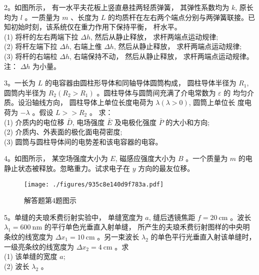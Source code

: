 2。如图所示， 有一水平夫花板上竖直悬挂两轻质弹簧， 其弹性系数均为 $k$, 原长均为 $l$ 。一质量为 $m$ 、长度为 $L$ 的均质杆在左右两个端点分别与两弹簧联接。已知初始时刻，该系统仅在重力作用下保持平衡， 杆水平。\\
(1) 将杆的左右两端下拉 $\Delta h$, 然后从静止释放， 求杆两端点运动规律;\\
(2) 将杆左端下拉 $\Delta h$, 右端上倠 $\Delta h$, 然后从静止释放， 求杆两端点运动规律;\\
(3) 将杆的右端柆 $\Delta h$, 右端保持不动， 然后从静止释放， 求杆两端点运动规律。 注： $\Delta h$ 为小量。

3。一长为 $L$ 的电容器由圆柱形导体和同轴导体圆筒构成， 圆柱导体半径为 $R_{1}$, 圆筒内半径为 $R_{2}\left(R_{2}>R_{1}\right)$ 。圆柱导体与圆筒间充满了介电常数为 $\varepsilon$ 的
均匀介质。设沿轴线方向， 圆柱导体上单位长度电荷为 $\lambda(\lambda>0)$, 圆筒上单位长 度电荷为 $-\lambda$ 。假设 $L>>R_{2}$ 。 求：\\
(1) 介质内的电位移 $\bar{D}$, 电场强度 $\bar{E}$ 及电极化强度 $\bar{P}$ 的大小和方向;\\
(2) 介质内、外表面的极化面电荷密度;\\
(3) 圆筒与圆柱导体间的电势差和该电容器的电容。

4。如图所示， 某空场强度大小为 $E$, 磁感应强度大小为 $B$ 。一个质量为 $m$ 的电静止状态被释放。忽略重力。试求电子在 $y$ 方向的最友位移。
\begin{figure}[ht]
\centering
\texttt{[image: ./figures/935c8e140d9f783a.pdf]}
\caption{解答题第4题图示} \label{fig_CAS13_1}
\end{figure}
5。单缝的夫琅禾费衍射实验中， 单缝宽度为 $a$, 缝后透镜焦距 $f=20 \mathrm{~cm}$ 。波长 $\lambda_1= 600 \mathrm{~nm}$ 的平行单色光垂直入射单缝， 所产生的夫琅禾费衍射图样的中央明条纹的线宽度为 $\Delta x_{1}=10 \mathrm{~cm}$ 。另一束波长 $\lambda_{2}$ 的单色平行光垂直入射该单缝时， 一级亮条纹的线宽度为 $\Delta x_{2}=4 \mathrm{~cm}$ 。求\\
(1) 该单缝的宽度 $a$;\\
(2) 波长 $\lambda_{2}$ 。